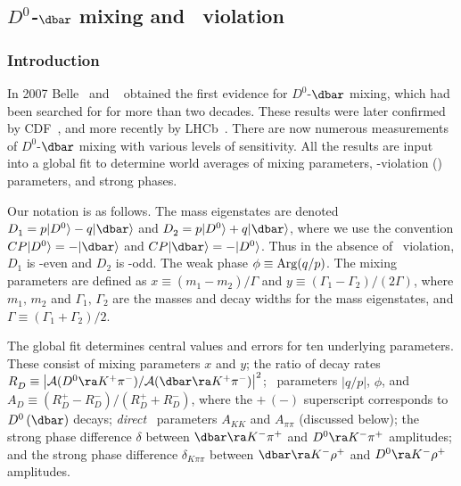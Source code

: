 \subsection{\emph{$D^0$-$\dbar$} mixing and \emph{\cp}\ violation}
\label{sec:charm:mixcpv}

\subsubsection{Introduction}

In 2007 Belle~\cite{Staric:2007dt} and \babar~\cite{Aubert:2007wf} 
obtained the first evidence for $D^0$-$\dbar$ mixing, which 
had been searched for for more than two decades. 
These results were later confirmed by CDF~\cite{Aaltonen:2007uc},
and more recently by LHCb~\cite{Aaij:2013wda}.
There are now numerous measurements of $D^0$-$\dbar$ mixing 
with various levels of sensitivity. All the results are
input into a global fit to determine
world averages of mixing parameters, \cp-violation (\cpv) 
parameters, and strong phases.

Our notation is as follows.
The mass eigenstates are denoted 
$D^{}_1 = p|D^0\rangle-q|\dbar\rangle$ and
$D^{}_2 = p|D^0\rangle+q|\dbar\rangle$, 
where we use the convention 
$CP|D^0\rangle=-|\dbar\rangle$ and 
$CP|\dbar\rangle=-|D^0\rangle$. Thus in the absence of 
\cp\ violation, $D^{}_1$ is \cp-even and $D^{}_2$ is \cp-odd.
The weak phase $\phi\equiv {\rm Arg}(q/p)$.
The mixing parameters are defined as 
$x\equiv(m^{}_1-m^{}_2)/\Gamma$ and 
$y\equiv (\Gamma^{}_1-\Gamma^{}_2)/(2\Gamma)$, where 
$m^{}_1,\,m^{}_2$ and $\Gamma^{}_1,\,\Gamma^{}_2$ are
the masses and decay widths for the mass eigenstates,
and $\Gamma\equiv (\Gamma^{}_1+\Gamma^{}_2)/2$. 


The global fit determines central values and errors
for ten underlying parameters. These consist of 
mixing parameters $x$ and $y$; 
the ratio of decay rates
$R^{}_D\equiv\left|{\cal A}(D^0\ra K^+\pi^-)/
              {\cal A}(\dbar\ra K^+\pi^-)\right|^2$;
\cpv\ parameters $|q/p|$, $\phi$, and
$A^{}_D\equiv (R^+_D-R^-_D)/(R^+_D+R^-_D)$, where the $+\,(-)$
superscript corresponds to $D^0\,(\dbar)$ decays; 
{\it direct\/} \cpv\ parameters $A^{}_{KK}$ and 
$A^{}_{\pi\pi}$ (discussed below); 
the strong phase difference
$\delta$ between $\dbar\ra K^-\pi^+$ and 
$D^0\ra K^-\pi^+$ amplitudes; and 
the strong phase difference $\delta^{}_{K\pi\pi}$ between 
$\dbar\ra K^-\rho^+$ and $D^0\ra K^-\rho^+$ amplitudes. 

